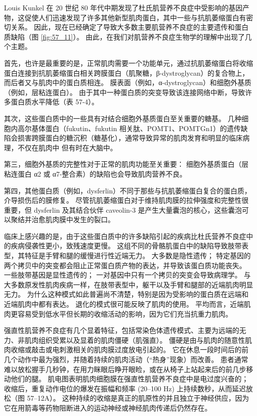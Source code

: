Louis Kunkel 在 20 世纪 80 年代中期发现了杜氏肌营养不良症中受影响的基因产物，这促使人们迅速发现了许多其他新型肌肉蛋白，其中一些与抗肌萎缩蛋白有密切关系。
因此，现在已经确定了导致大多数主要肌营养不良症的主要遗传和蛋白质缺陷（图 \ref{fig:57_11}）。
由此，在我们对肌营养不良症生物学的理解中出现了几个主题。


首先，也许是最重要的是，正常肌肉需要一个功能单元，通过抗肌萎缩蛋白将收缩蛋白连接到抗肌萎缩蛋白相关跨膜蛋白（肌聚糖，β-dystroglycan）的复合物上，而后者又与肌肉中的蛋白质相连。
膜表面（例如，α-dystroglycan）和细胞外基质（例如，层粘连蛋白）。
由于其中一种蛋白质的突变导致该连接网络中断，导致许多蛋白质水平降低（表 57-4）。


其次，这些蛋白质中的一些具有对结合细胞外基质蛋白至关重要的糖基。
几种细胞内高尔基体蛋白（fukutin、fukutin 相关肽、POMT1、POMTGn1）的遗传缺陷会损害跨膜蛋白的糖沉积（糖基化），通常导致异常的肌肉发育和明显的临床病理，不仅在肌肉中 但有时在大脑中。


第三，细胞外基质的完整性对于正常的肌肉功能至关重要：
细胞外基质蛋白（层粘连蛋白 α2 或 α7-整合素）的缺陷也会导致肌肉营养不良。


第四，其他蛋白质（例如，dysferlin）不同于那些与抗肌萎缩蛋白复合的蛋白质，介导损伤后的膜修复。
尽管抗肌萎缩蛋白对于维持肌肉膜的拉伸强度和完整性很重要，但 dysferlin 及其结合伙伴 caveolin-3 是产生大量囊泡的核心，这些囊泡可以聚结并治愈肌肉膜中发生的裂口。


临床上感兴趣的是，由于这些蛋白质中的许多缺陷引起的疾病比杜氏营养不良症中的疾病侵袭性更小，致残速度更慢。
这组不同的骨骼肌蛋白中的缺陷导致肢带表型，其特征是手臂和腿的缓慢进行性近端无力。
大多数是隐性遗传； 特定基因的两个拷贝中的突变都会阻止正常蛋白质产物的表达，并导致该蛋白质功能丧失。
一些肢带基因是显性遗传的；
一对基因中只有一个拷贝的突变会导致病理学。
与大多数原发性肌肉疾病一样，在肢带表型中，躯干以及手臂和腿部的近端肌肉明显无力。
为什么这种模式如此普遍尚不清楚，特别是因为受影响的蛋白质在远端和近端肌肉中都有表达。
退化的模式很可能反映了肌肉的使用。
平均而言，近端肌肉更容易受到低水平但长期的收缩活动的影响，因为它们充当抗重力肌肉。


强直性肌营养不良症有几个显着特征，包括常染色体遗传模式、主要为远端的无力、非肌肉组织受累以及显着的肌肉僵硬（肌强直）。
僵硬是由与肌肉的随意性肌肉收缩或敲击或电刺激相关的肌肉膜过度放电引起的。
它在休息一段时间后的前几个动作中最为强烈，并随着持续的肌肉活动（“热身”现象）而改善。
患者通常难以放松握手几秒钟，在用力眯眼后睁开眼睑，或在从椅子上站起来后的前几步移动他们的腿。
肌电图表明肌肉细胞膜在强直性肌营养不良症中是电过度兴奋的；
收缩后，重复动作电位的爆发在振幅和频率 (20–100 Hz) 上持续数秒，从而延迟放松（图 57–12A）。
这种持续的收缩是真正的肌原性的并且独立于神经供应，因为它在用箭毒等药物阻断进入的运动神经或神经肌肉传递后仍然存在。


